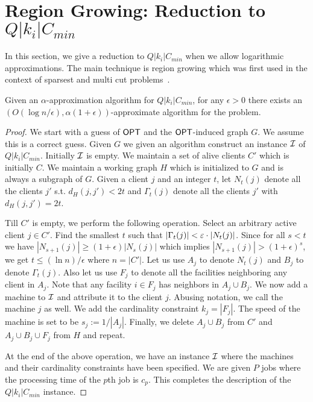 \section{Region Growing: Reduction to $Q|k_i|C_{min}$}
In this section, we give a reduction to $Q|k_i|C_{min}$ when we allow logarithmic approximations. The main technique is region growing which was first used in the context of sparsest and multi cut problems~\cite{LeightonRao,GVY}.
\begin{theorem}\label{thm:red}
	Given an $\alpha$-approximation algorithm for $Q|k_i|C_{min}$, for any $\epsilon>0$ there exists an \\ $\left(O(\log n/\epsilon), \alpha(1+\epsilon)\right)$-approximate algorithm for the \mckc problem.
\end{theorem}
\begin{proof}
	We start with a guess of $\mathsf{OPT}$ and the $\mathsf{OPT}$-induced graph $G$. We assume this is a correct guess.
	Given $G$ we given an algorithm construct an instance ${\cal I}$ of $Q|k_i|C_{min}$.
	Initially ${\cal I}$ is empty. We maintain a set of alive clients $C'$ which is initially $C$. We maintain a working graph $H$ which is initialized to $G$ and is always a subgraph of $G$.
	Given a client $j$ and an integer $t$, let $N_t(j)$ denote all the clients $j'$ s.t. $d_H(j,j') < 2t$ and $\Gamma_t(j)$ denote all the clients $j'$ with $d_H(j,j')  = 2t$.\smallskip
	
	
	Till $C'$ is empty, we perform the following operation.
	Select an arbitrary active client $j\in C'$. Find the smallest $t$ such that $|\Gamma_t(j)| < \varepsilon\cdot |N_t(j)|$. Since for all $s < t$ we have $|N_{s+1}(j)|\geq (1+\epsilon)|N_s(j)|$ which implies $|N_{s+1}(j)| > (1+\epsilon)^s$, 
	we get  $t \leq (\ln n)/\epsilon$ where $n=|C'|$. Let us use $A_j$ to denote $N_t(j)$ and $B_j$ to denote $\Gamma_{t}(j)$. Also let us use $F_j$ to denote all the facilities neighboring any client in $A_j$. Note that any facility $i\in F_j$ has neighbors in $A_j \cup B_j$.
	We now add a machine to ${\cal I}$ and attribute it to the client $j$. Abusing notation, we call the machine $j$ as well.
	We add the  cardinality constraint $k_j = |F_j|$. The speed of the machine is set to be $s_j := 1/|A_j|$.
	Finally,  we delete $A_j\cup B_j$ from $C'$ and $A_j\cup B_j\cup F_j$ from $H$ and repeat. \smallskip
	
	At the end of the above operation, we have an instance ${\cal I}$ where the machines and their cardinality constraints have been specified.
	We are given $P$ jobs where the processing time of the $p$th job is $c_p$. This completes the description of the $Q|k_i|C_{min}$ instance.
	

\end{proof}
